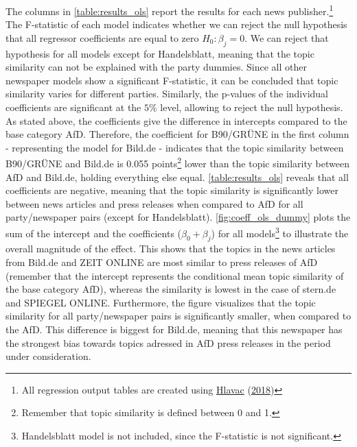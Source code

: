 \documentclass[
  12pt,
]{article}
\begin{document}
The columns in \autoref{table:results_ols} report the results for each
news publisher.\footnote{All regression output tables are created using
  \protect\hyperlink{ref-hlavac_stargazer_2018}{Hlavac}
  (\protect\hyperlink{ref-hlavac_stargazer_2018}{2018})} The F-statistic
of each model indicates whether we can reject the null hypothesis that
all regressor coefficients are equal to zero \(H_0: \beta_j=0\). We can
reject that hypothesis for all models except for Handelsblatt, meaning
that the topic similarity can not be explained with the party dummies.
Since all other newspaper models show a significant F-statistic, it can
be concluded that topic similarity varies for different parties.
Similarly, the p-values of the individual coefficients are significant
at the \(5\%\) level, allowing to reject the null hypothesis. As stated
above, the coefficients give the difference in intercepts compared to
the base category AfD. Therefore, the coefficient for B90/GRÜNE in the
first column - representing the model for Bild.de - indicates that the
topic similarity between B90/GRÜNE and Bild.de is 0.055
points\footnote{Remember that topic similarity is defined between 0 and
  1.} lower than the topic similarity between AfD and Bild.de, holding
everything else equal. \autoref{table:results_ols} reveals that all
coefficients are negative, meaning that the topic similarity is
significantly lower between news articles and press releases when
compared to AfD for all party/newspaper pairs (except for Handelsblatt).
\autoref{fig:coeff_ols_dummy} plots the sum of the intercept and the
coefficients (\(\beta_0+\beta_{j}\)) for all models\footnote{Handelsblatt
  model is not included, since the F-statistic is not significant.} to
illustrate the overall magnitude of the effect. This shows that the
topics in the news articles from Bild.de and ZEIT ONLINE are most
similar to press releases of AfD (remember that the intercept represents
the conditional mean topic similarity of the base category AfD), whereas
the similarity is lowest in the case of stern.de and SPIEGEL ONLINE.
Furthermore, the figure visualizes that the topic similarity for all
party/newspaper pairs is significantly smaller, when compared to the
AfD. This difference is biggest for Bild.de, meaning that this newspaper
has the strongest bias towards topics adressed in AfD press releases in
the period under consideration.
\end{document}
